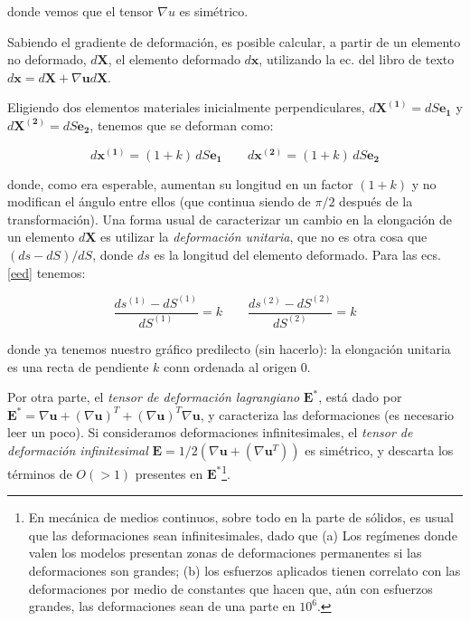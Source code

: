 \documentclass[10pt,a4paper]{article}
\begin{document}
\noindent donde vemos que el tensor $\nabla u$ es simétrico.

Sabiendo el gradiente de deformación, es posible calcular, a partir de un elemento no deformado, $d\mathbf{X}$, el elemento deformado $d\mathbf{x}$, utilizando la ec. del libro de texto $d\mathbf{x} = d\mathbf{X} + \nabla \mathbf{u} d\mathbf{X}$.

Eligiendo dos elementos materiales inicialmente perpendiculares, $d\mathbf{X^{(1)}} = dS \mathbf{e_1}$ y $d\mathbf{X^{(2)}} = dS \mathbf{e_2}$, tenemos que se deforman como:

\begin{equation}\label{eed}
d\mathbf{x^{(1)}} = (1  + k) \, dS \mathbf{e_1}  \quad \quad d\mathbf{x^{(2)}} = (1  + k ) \, dS \mathbf{e_2}  
\end{equation}

\noindent donde, como era esperable, aumentan su longitud en un factor $(1+k)$ y no modifican el ángulo entre ellos (que continua siendo de $\pi/2$ después de la transformación). Una forma usual de caracterizar un cambio en la elongación de un elemento $d\mathbf{X}$ es utilizar la \textit{deformación unitaria}, que no es otra cosa que  $(ds - dS)/dS$, donde $ds$ es la longitud del elemento deformado. Para las ecs. \eqref{eed} tenemos:

\begin{equation}\label{eelu}
\frac{ds^{(1)}-dS^{(1)}}{dS^{(1)}} = k  \quad \quad \frac{ds^{(2)}-dS^{(2)}}{dS^{(2)}} = k  
\end{equation}

\noindent donde ya tenemos nuestro gráfico predilecto (sin hacerlo): la elongación unitaria es una recta de pendiente $k$ conn ordenada al origen $0$.

Por otra parte, el \textit{tensor de deformación lagrangiano} $\mathbf{E}^*$, está dado por $\mathbf{E}^* = \nabla \mathbf{u} + (\nabla \mathbf{u})^T + (\nabla \mathbf{u})^T \nabla \mathbf{u}$, y caracteriza las deformaciones (es necesario leer un poco). Si consideramos deformaciones infinitesimales, el \textit{tensor de deformación infinitesimal} $\mathbf{E} = 1/2 (\nabla \mathbf{u} + (\nabla \mathbf{u}^T))$ es simétrico, y descarta los términos de $O(>1)$ presentes en $\mathbf{E}^*$\footnote{En mecánica de medios continuos, sobre todo en la parte de sólidos, es usual que las deformaciones sean infinitesimales, dado que (a) Los regímenes donde valen los modelos presentan zonas de deformaciones permanentes si las deformaciones son grandes; (b) los esfuerzos aplicados tienen correlato con las deformaciones por medio de constantes que hacen que, aún con esfuerzos grandes, las deformaciones sean de una parte en $10^6$.}.
\end{document}
